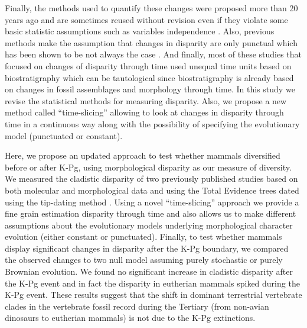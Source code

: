 \documentclass[12pt,letterpaper]{article}
\begin{document}
\begin{enumerate}
    Finally, the methods used to quantify these changes were proposed more than 20 years ago \citep{Foote01071994,Wills1994} and are sometimes reused without revision even if they violate some basic statistic assumptions such as variables independence \citep{brusatte50,Brusatte12092008,cisneros2010,thorneresetting2011,prentice2011,brusattedinosaur2012,toljagictriassic-jurassic2013,ruta2013,bentonmodels2014,bensonfaunal2014}.
    Also, previous methods make the assumption that changes in disparity are only punctual \citep[e.g.][]{Wesley-Hunt2005} which has been shown to be not always the case \citep{Hunt21042015}.
    And finally, most of these studies that focused on changes of disparity through time used unequal time units based on biostratigraphy \citep{Brusatte12092008,brusattedinosaur2012,toljagictriassic-jurassic2013} which can be tautological since biostratigraphy is already based on changes in fossil assemblages and morphology through time.
    In this study we revise the statistical methods for measuring disparity.
    Also, we propose a new method called ``time-slicing'' allowing to look at changes in disparity through time in a continuous way along with the possibility of specifying the evolutionary model (punctuated or constant).
  \end{enumerate}

Here, we propose an updated approach to test whether mammals diversified before or after K-Pg, using morphological disparity as our measure of diversity.
We measured the cladistic disparity of two previously published studies \citep{Slater2012MEE,beckancient2014} based on both molecular and morphological data and using the Total Evidence trees dated using the tip-dating method \citep{ronquista2012,Wood01032013}.
Using a novel ``time-slicing'' approach we provide a fine grain estimation disparity through time and also allows us to make different assumptions about the evolutionary models underlying morphological character evolution (either constant or punctuated). 
Finally, to test whether mammals display significant changes in disparity after the K-Pg boundary, we compared the observed changes to two null model assuming purely stochastic or purely Brownian evolution. 
We found no significant increase in cladistic disparity after the K-Pg event and in fact the disparity in eutherian mammals spiked during the K-Pg event. 
These results suggest that the shift in dominant terrestrial vertebrate clades in the vertebrate fossil record during the Tertiary (from non-avian dinosaurs to eutherian mammals) is not due to the K-Pg extinctions.
\end{document}
